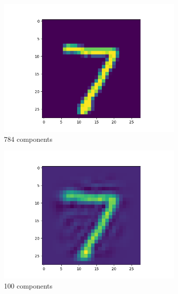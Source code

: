 \begin{figure}
  \centering
  \begin{subfigure}{0.3\linewidth}
    \includegraphics[width=\linewidth]{Images/filtered-input-pca-784-components.png}
    \caption{784 components}
  \end{subfigure}
  \begin{subfigure}{0.3\linewidth}
    \includegraphics[width=\linewidth]{Images/filtered-input-pca-100-components.png}
    \caption{100 components}
  \end{subfigure}
  \begin{subfigure}{0.3\linewidth}

\end{subfigure}
\end{figure}
